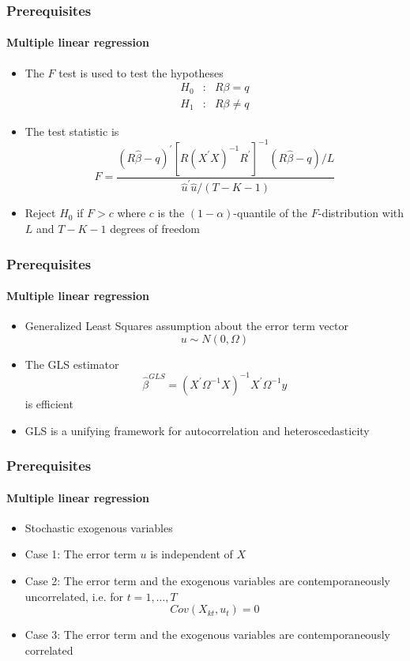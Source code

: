 \documentclass[notes=show]{beamer}
\begin{document}
\begin{frame}\frametitle{Prerequisites}\framesubtitle{Multiple linear regression}
\begin{itemize}
    \item The $F$ test is used to test the hypotheses%
        \begin{eqnarray*}
            H_{0} &:&R\beta =q \\
            H_{1} &:&R\beta \neq q
        \end{eqnarray*}
    \item The test statistic is
        \begin{equation*}
            F=\frac{\left( R\hat{\beta}-q\right) ^{\prime }\left[ R\left( X^{\prime}X\right) ^{-1}R^{\prime }\right] ^{-1}\left( R\hat{\beta}-q\right) /L}{\hat{u}^{\prime }\hat{u}/(T-K-1)}
        \end{equation*}
    \item Reject $H_{0}$ if $F>c$ where $c$ is the $\left( 1-\alpha \right) $-quantile of the $F$-distribution with $L$ and $T-K-1$ degrees of freedom
\end{itemize}
\end{frame}


\begin{frame}\frametitle{Prerequisites}\framesubtitle{Multiple linear regression}
\begin{itemize}
    \item Generalized Least Squares assumption about the error term vector%
    \begin{equation*}
        u\sim N\left( 0,\Omega \right)
    \end{equation*}
\item The GLS estimator
\begin{equation*}
    \hat{\beta}^{GLS}=\left( X^{\prime }\Omega ^{-1}X\right) ^{-1}X^{\prime}\Omega ^{-1}y
\end{equation*}
is efficient
\item GLS is a unifying framework for autocorrelation and heteroscedasticity
\end{itemize}
\end{frame}


\begin{frame}\frametitle{Prerequisites}\framesubtitle{Multiple linear regression}
\begin{itemize}
    \item Stochastic exogenous variables
    \item Case 1: The error term $u$ is independent of $X$
    \item Case 2: The error term and the exogenous variables are contemporaneously uncorrelated, i.e. for $t=1,\ldots ,T$
        \begin{equation*}
            Cov(X_{kt},u_{t})=0
        \end{equation*}
    \item Case 3: The error term and the exogenous variables are contemporaneously correlated
\end{itemize}
\end{frame}
\end{document}
